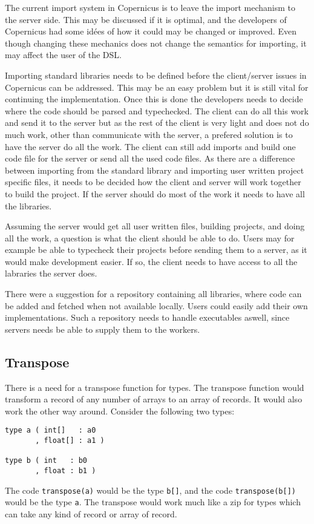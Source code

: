 The current import system in Copernicus is to leave the import
mechanism to the server side. This may be discussed if it is optimal,
and the developers of Copernicus had some idées of how it could may be
changed or improved. Even though changing these mechanics does not
change the semantics for importing, it may affect the user of the DSL.

Importing standard libraries needs to be defined before the
client/server issues in Copernicus can be addressed. This may be an
easy problem but it is still vital for continuing the
implementation. Once this is done the developers needs to decide where
the code should be parsed and typechecked. The client can do all this
work and send it to the server but as the rest of the client is very
light and does not do much work, other than communicate with the
server, a prefered solution is to have the server do all the work. The
client can still add imports and build one code file for the server or
send all the used code files. As there are a difference between
importing from the standard library and importing user written project
specific files, it needs to be decided how the client and server will
work together to build the project. If the server should do most of
the work it needs to have all the libraries.

Assuming the server would get all user written files, building
projects, and doing all the work, a question is what the client should
be able to do. Users may for example be able to typecheck their
projects before sending them to a server, as it would make development
easier. If so, the client needs to have access to all the labraries
the server does.

There were a suggestion for a repository containing all libraries,
where code can be added and fetched when not available locally. Users
could easily add their own implementations. Such a repository needs to
handle executables aswell, since servers needs be able to supply them
to the workers.

\subsection{Transpose}
There is a need for a transpose function for types. The transpose
function would transform a record of any number of arrays to an array
of records. It would also work the other way around. Consider the
following two types:

\begin{verbatim}
type a ( int[]   : a0
       , float[] : a1 )

type b ( int   : b0
       , float : b1 )
\end{verbatim}

The code \verb#transpose(a)# would be the type \verb#b[]#, and the
code \verb#transpose(b[])# would be the type \verb#a#. The transpose
would work much like a zip for types which can take any kind of record
or array of record.
